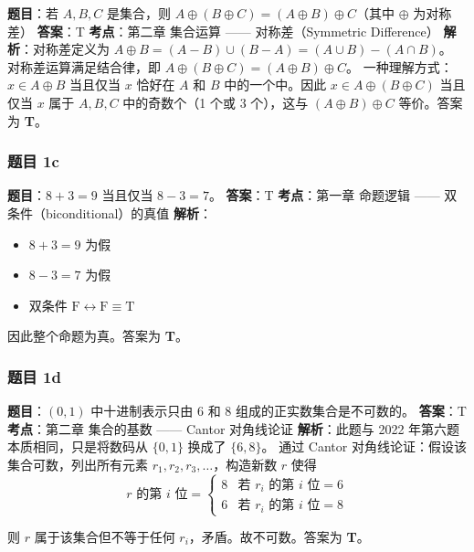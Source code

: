\documentclass[10pt,a4paper,openany]{ctexbook}
\theoremstyle{definition}
\theoremstyle{remark}
\begin{document}
\textbf{题目}：若 $A, B, C$ 是集合，则 $A \oplus (B \oplus C) = (A \oplus B) \oplus C$（其中 $\oplus$ 为对称差）
\textbf{答案}：T
\textbf{考点}：第二章 集合运算 —— 对称差（Symmetric Difference）
\textbf{解析}：对称差定义为 $A \oplus B = (A - B) \cup (B - A) = (A \cup B) - (A \cap B)$。
对称差运算满足结合律，即 $A \oplus (B \oplus C) = (A \oplus B) \oplus C$。
一种理解方式：$x \in A \oplus B$ 当且仅当 $x$ 恰好在 $A$ 和 $B$ 中的一个中。因此 $x \in A \oplus (B \oplus C)$ 当且仅当 $x$ 属于 $A, B, C$ 中的奇数个（1 个或 3 个），这与 $(A \oplus B) \oplus C$ 等价。答案为 \textbf{T}。
\vspace{-2pt}

\subsubsection{题目 1c}

\textbf{题目}：$8 + 3 = 9$ 当且仅当 $8 - 3 = 7$。
\textbf{答案}：T
\textbf{考点}：第一章 命题逻辑 —— 双条件（biconditional）的真值
\textbf{解析}：
\begin{itemize}
\item $8 + 3 = 9$ 为假
\item $8 - 3 = 7$ 为假
\item 双条件 $\mathrm{F} \leftrightarrow \mathrm{F} \equiv \mathrm{T}$

\end{itemize}

因此整个命题为真。答案为 \textbf{T}。
\vspace{-2pt}

\subsubsection{题目 1d}

\textbf{题目}：$(0,1)$ 中十进制表示只由 6 和 8 组成的正实数集合是不可数的。
\textbf{答案}：T
\textbf{考点}：第二章 集合的基数 —— Cantor 对角线论证
\textbf{解析}：此题与 2022 年第六题本质相同，只是将数码从 $\{0,1\}$ 换成了 $\{6,8\}$。
通过 Cantor 对角线论证：假设该集合可数，列出所有元素 $r_1, r_2, r_3, \ldots$，构造新数 $r$ 使得
\[
r\text{ 的第 }i\text{ 位} = \begin{cases}
8 & \text{若 } r_i\text{ 的第 }i\text{ 位} = 6 \\
6 & \text{若 } r_i\text{ 的第 }i\text{ 位} = 8
\end{cases}
\]

则 $r$ 属于该集合但不等于任何 $r_i$，矛盾。故不可数。答案为 \textbf{T}。
\vspace{-2pt}
\end{document}
